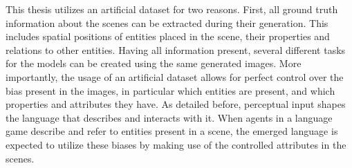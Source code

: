 This thesis utilizes an artificial dataset for two reasons.
First, all ground truth information about the scenes can be extracted during their generation.
This includes spatial positions of entities placed in the scene, their properties and relations to other entities.
Having all information present, several different tasks for the models can be created using the same generated images.
More importantly, the usage of an artificial dataset allows for perfect control over the bias present in the images, in particular which entities are present, and which properties and attributes they have.
As detailed before, perceptual input shapes the language that describes and interacts with it.
When agents in a language game describe and refer to entities present in a scene, the emerged language is expected to utilize these biases by making use of the controlled attributes in the scenes.
